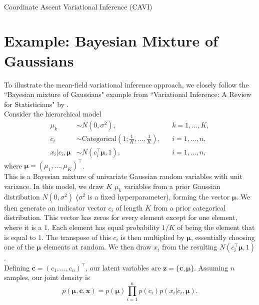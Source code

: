 \documentclass[honours,12pt]{unswthesis}
\numberwithin{equation}{section}
\theoremstyle{definition}
\begin{document}
\\
\begin{algorithm}[H]
\caption{Coordinate Ascent Variational Inference (CAVI)}
\BlankLine
{}
\end{algorithm}
\newpage
\section{Example: Bayesian Mixture of Gaussians}
To illustrate the mean-field variational inference approach, we closely follow the ``Bayesian mixture of Gaussians" example from ``Variational Inference: A Review for Statisticians" by \citet{blei}.\\
Consider the hierarchical model
\begin{align*}
\mu_k&\sim N(0,\sigma^2), &&k=1,\dots,K,\\
c_i&\sim \text{Categorical}\left(1;\frac{1}{K},\dots,\frac{1}{K}\right), &&i=1,\dots,n,\\
x_i|c_i,\bm{\mu}&\sim N(c^\top_i\bm{\mu},1), &&i=1,\dots,n,
\end{align*}
where $\bm{\mu}=(\mu_1,\dots,\mu_K)^\top$.\\
This is a Bayesian mixture of univariate Gaussian random variables with unit variance. In this model, we draw $K$ $\mu_k$ variables from a prior Gaussian distribution $N(0,\sigma^2)$ ($\sigma^2$ is a fixed hyperparameter), forming the vector $\bm{\mu}$. We then generate an indicator vector $c_i$ of length $K$ from a prior categorical distribution. This vector has zeros for every element except for one element, where it is a $1$. Each element has equal probability $1/K$ of being the element that is equal to $1$. The transpose of this $c_i$ is then multiplied by $\bm{\mu}$, essentially choosing one of the $\bm{\mu}$ elements at random. We then draw $x_i$ from the resulting $N(c^\top_i\bm{\mu},1)$.\\
Defining $\bm{c}=(c_1,\dots,c_n)^\top$, our latent variables are $\bm{z}=\{\bm{c},\bm{\mu}\}$. Assuming $n$ samples, our joint density is
\begin{equation}
p(\bm{\mu},\bm{c},\bm{x})=p(\bm{\mu})\prod^n_{i=1}p(c_i)p(x_i|c_i, \bm{\mu}).\end{equation}
\end{document}
